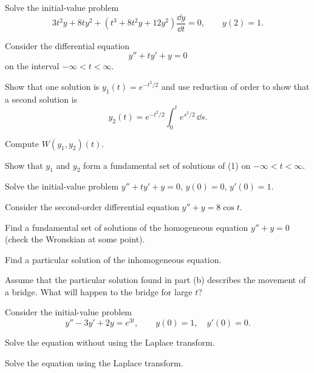 \documentclass[11pt,oneside]{article}
\begin{document}
\begin{problem}
Solve the initial-value problem
\[
3t^2y+8ty^2+(t^3+8t^2y+12y^2)\frac{\dd y}{\dd t}=0,\qquad y(2)=1.
\]
\end{problem}

\begin{problem}
Consider the differential equation
\[
y''+ty'+y=0 \tag{1}
\]
on the interval $-\infty<t<\infty$.
\begin{problemsubparts}
\item Show that one solution is $y_1(t)=e^{-t^2/2}$ and use reduction of order to show that a second solution is
\[
y_2(t)=e^{-t^2/2}\int_0^t e^{s^2/2}\,\dd s.
\]
\item Compute $W(y_1,y_2)(t)$.
\item Show that $y_1$ and $y_2$ form a fundamental set of solutions of (1) on $-\infty<t<\infty$.
\item Solve the initial-value problem $y''+ty'+y=0$, $y(0)=0$, $y'(0)=1$.
\end{problemsubparts}
\end{problem}

\begin{problem}
Consider the second-order differential equation $y''+y=8\cos t$.
\begin{problemsubparts}
\item Find a fundamental set of solutions of the homogeneous equation $y''+y=0$ (check the Wronskian at some point).
\item Find a particular solution of the inhomogeneous equation.
\item Assume that the particular solution found in part (b) describes the movement of a bridge. What will happen to the bridge for large $t$?
\end{problemsubparts}
\end{problem}

\begin{problem}
Consider the initial-value problem
\[
y''-3y'+2y=e^{3t},\qquad y(0)=1,\quad y'(0)=0.
\]
\begin{problemsubparts}
\item Solve the equation without using the Laplace transform.
\item Solve the equation using the Laplace transform.
\end{problemsubparts}
\end{problem}
\end{document}
